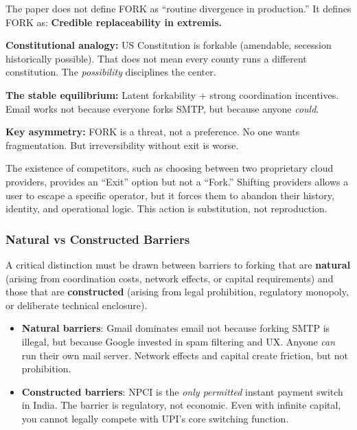 \begin{clarification}
The paper does not define FORK as ``routine divergence in production.'' It defines FORK as: \textbf{Credible replaceability in extremis.}

\textbf{Constitutional analogy:} US Constitution is forkable (amendable, secession historically possible). That does not mean every county runs a different constitution. The \textit{possibility} disciplines the center.

\textbf{The stable equilibrium:} Latent forkability + strong coordination incentives. Email works not because everyone forks SMTP, but because anyone \textit{could}.

\textbf{Key asymmetry:} FORK is a threat, not a preference. No one wants fragmentation. But irreversibility without exit is worse.
\end{clarification}

The existence of competitors, such as choosing between two proprietary cloud providers, provides an ``Exit'' option but not a ``Fork.'' Shifting providers allows a user to escape a specific operator, but it forces them to abandon their history, identity, and operational logic. This action is substitution, not reproduction.

\subsubsection{Natural vs Constructed Barriers}

A critical distinction must be drawn between barriers to forking that are \textbf{natural} (arising from coordination costs, network effects, or capital requirements) and those that are \textbf{constructed} (arising from legal prohibition, regulatory monopoly, or deliberate technical enclosure).

\begin{itemize}
    \item \textbf{Natural barriers}: Gmail dominates email not because forking SMTP is illegal, but because Google invested in spam filtering and UX. Anyone \textit{can} run their own mail server. Network effects and capital create friction, but not prohibition.
    \item \textbf{Constructed barriers}: NPCI is the \textit{only permitted} instant payment switch in India. The barrier is regulatory, not economic. Even with infinite capital, you cannot legally compete with UPI's core switching function.
\end{itemize}


